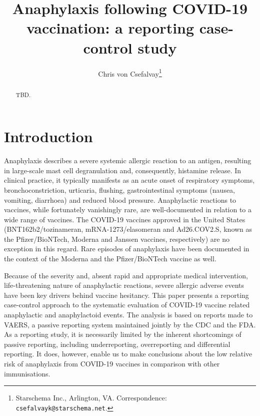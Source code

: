 \documentclass{article}
\title{Anaphylaxis following COVID-19 vaccination: a reporting case-control study}
\author{Chris von Csefalvay\thanks{Starschema Inc., Arlington, VA. Correspondence: \texttt{csefalvayk@starschema.net}.}}
\begin{document}
\maketitle

\begin{abstract}
    TBD.
\end{abstract}

\section{Introduction}

Anaphylaxis describes a severe systemic allergic reaction to an antigen, resulting in large-scale mast cell degranulation and, consequently, histamine release.\cite{metcalfe2009mechanisms}
In clinical practice, it typically manifests as an acute onset of respiratory symptoms, bronchoconstriction, urticaria, flushing, gastrointestinal symptoms (nausea, vomiting, diarrhoea) and reduced blood pressure.\cite{lee2011anaphylaxis}
Anaphylactic reactions to vaccines, while fortunately vanishingly rare, are well-documented in relation to a wide range of vaccines.\cite{su2019anaphylaxis,kelso1999anaphylaxis,kelso1993anaphylaxis,nagao2016highly}
The COVID-19 vaccines approved in the United States (BNT162b2/tozinameran, mRNA-1273/elasomeran and Ad26.COV2.S, known as the Pfizer/BioNTech, Moderna and Janssen vaccines, respectively) are no exception in this regard.
Rare episodes of anaphylaxis have been documented in the context of the Moderna\cite{covid2021allergicmoderna} and the Pfizer/BioNTech vaccine as well.\cite{shimabukuro2021allergic}

Because of the severity and, absent rapid and appropriate medical intervention, life-threatening nature of anaphylactic reactions, severe allergic adverse events have been key drivers behind vaccine hesitancy.\cite{tulloch2021covid,marcec2021postvaccination,jacobson2015vaccine}
This paper presents a reporting case-control approach to the systematic evaluation of COVID-19 vaccine related anaphylactic and anaphylactoid events.
The analysis is based on reports made to VAERS, a passive reporting system maintained jointly by the CDC and the FDA.\cite{singleton1999overview,chen1994vaccine}
As a reporting study, it is necessarily limited by the inherent shortcomings of passive reporting, including underreporting, overreporting and differential reporting.
It does, however, enable us to make conclusions about the low relative risk of anaphylaxis from COVID-19 vaccines in comparison with other immunisations.
\end{document}
